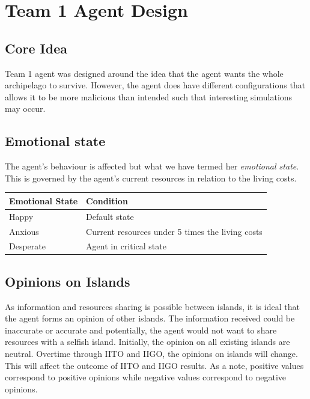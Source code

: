 \chapter{Team 1 Agent Design}

\section{Core Idea}
Team 1 agent was designed around the idea that the agent wants the whole archipelago to survive. However, the agent does have different configurations that allows it to be more malicious than intended such that interesting simulations may occur.

\section{Emotional state}

The agent's behaviour is affected but what we have termed her \emph{emotional state}. This is governed by the agent's current resources in relation to the living costs.

\begin{table} [htb]
    \centering
    \begin{tabular}{|l|l|}
        \hline
        Emotional State & Condition \\
        \hline
        Happy & Default state \\
        \hline
        Anxious & Current resources under 5 times the living costs \\
        \hline
        Desperate & Agent in critical state \\
        \hline
    \end{tabular}
\end{table}


\section{Opinions on Islands}
As information and resources sharing is possible between islands, it is ideal that the agent forms an opinion of other islands. The information received could be inaccurate or accurate and potentially, the agent would not want to share resources with a selfish island. Initially, the opinion on all existing islands are neutral. Overtime through IITO and IIGO, the opinions on islands will change. This will affect the outcome of IITO and IIGO results. As a note, positive values correspond to positive opinions while negative values correspond to negative opinions.

